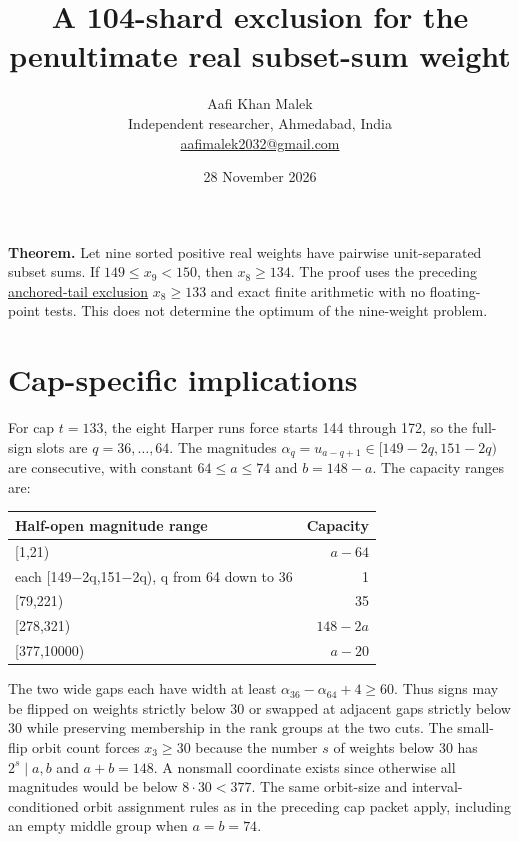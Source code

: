 \documentclass[11pt,letterpaper]{article}
\title{A 104-shard exclusion for the penultimate real subset-sum weight}
\author{Aafi Khan Malek\\ \small Independent researcher, Ahmedabad, India\\
\small\href{mailto:aafimalek2032@gmail.com}{aafimalek2032@gmail.com}}
\date{28 November 2026}
\begin{document}
\maketitle
\textbf{Theorem.} Let nine sorted positive real weights have pairwise
unit-separated subset sums. If \(149\le x_9<150\), then \(x_8\ge134\).
The proof uses the preceding
\href{https://github.com/Aafimalek/novel-discoveries/tree/7cfbde384eb7649281ab0d31c19394540c504940/nine-separated-subset-sums/verification/rank-cuts-below-150/penultimate-cap-132}{anchored-tail exclusion}
\(x_8\ge133\) and exact finite arithmetic with no floating-point tests.
This does not determine the optimum of the nine-weight problem.

\section{Cap-specific implications}\label{cap-specific-implications}

For cap \(t=133\), the eight Harper runs force starts 144 through 172,
so the full-sign slots are \(q=36,\dots,64\). The magnitudes
\(\alpha_q=u_{a-q+1}\in[149-2q,151-2q)\) are consecutive, with constant
\(64\le a\le74\) and \(b=148-a\). The capacity ranges are:

\begin{longtable}[]{@{}lr@{}}
\toprule\noalign{}
Half-open magnitude range & Capacity \\
\midrule\noalign{}
\endhead
\bottomrule\noalign{}
\endlastfoot
{[}1,21) & \(a-64\) \\
each {[}149−2q,151−2q), q from 64 down to 36 & 1 \\
{[}79,221) & 35 \\
{[}278,321) & \(148-2a\) \\
{[}377,10000) & \(a-20\) \\
\end{longtable}

The two wide gaps each have width at least
\(\alpha_{36}-\alpha_{64}+4\ge60\). Thus signs may be flipped on weights
strictly below 30 or swapped at adjacent gaps strictly below 30 while
preserving membership in the rank groups at the two cuts. The small-flip
orbit count forces \(x_3\ge30\) because the number \(s\) of weights
below 30 has \(2^s\mid a,b\) and \(a+b=148\). A nonsmall coordinate
exists since otherwise all magnitudes would be below \(8\cdot30<377\).
The same orbit-size and interval-conditioned orbit assignment rules as
in the preceding cap packet apply, including an empty middle group when
\(a=b=74\).
\end{document}
